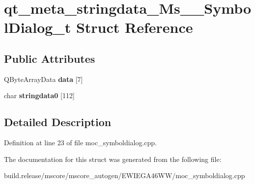 \hypertarget{structqt__meta__stringdata___ms_____symbol_dialog__t}{}\section{qt\+\_\+meta\+\_\+stringdata\+\_\+\+Ms\+\_\+\+\_\+\+Symbol\+Dialog\+\_\+t Struct Reference}
\label{structqt__meta__stringdata___ms_____symbol_dialog__t}
\subsection*{Public Attributes}
\begin{DoxyCompactItemize}
\item 
\mbox{\label{structqt__meta__stringdata___ms_____symbol_dialog__t_abc5812b18d42ef970285e4c9b6c5c303}} 
Q\+Byte\+Array\+Data {\bfseries data} \mbox{[}7\mbox{]}
\item 
\mbox{\label{structqt__meta__stringdata___ms_____symbol_dialog__t_aa0b1d5710efa806229e9db9884ad7bd7}} 
char {\bfseries stringdata0} \mbox{[}112\mbox{]}
\end{DoxyCompactItemize}


\subsection{Detailed Description}


Definition at line 23 of file moc\+\_\+symboldialog.\+cpp.



The documentation for this struct was generated from the following file\+:\begin{DoxyCompactItemize}
\item 
build.\+release/mscore/mscore\+\_\+autogen/\+E\+W\+I\+E\+G\+A46\+W\+W/moc\+\_\+symboldialog.\+cpp\end{DoxyCompactItemize}
